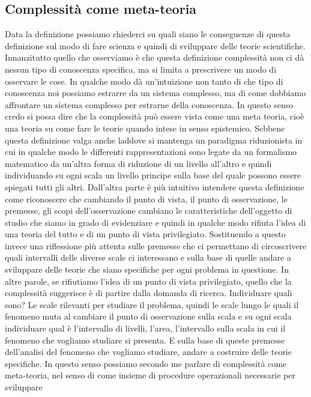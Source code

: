 \documentclass[a4paper, headings=standardclasses]{scrartcl}
\begin{document}
\subsection{Complessità come meta-teoria}
Data la definizione possiamo chiederci su quali siano le conseguenze di questa definizione
sul modo di fare scienza e quindi di sviluppare delle teorie scientifiche.
Innanzitutto quello che osserviamo è che questa definizione complessità non ci dà
nessun tipo di conoscenza specifica, ma si limita a prescrivere un modo di osservare le cose.
In qualche modo dà un'intuizione non tanto di che tipo di conoscenza noi possiamo estrarre
da un sistema complesso, ma di come dobbiamo affrontare un sistema complesso per estrarne
della conoscenza. In questo senso credo si possa dire che la complessità può essere vista
come una meta teoria, cioè una teoria su come fare le teorie quando intese in senso epistemico.
Sebbene questa definizione valga anche laddove si mantenga un paradigma riduzionista in cui
in qualche modo le differenti rappresentazioni sono legate da un formalismo matematico da un'altra
forma di riduzione di un livello all'altro e quindi individuando su ogni scala un livello
principe sulla base del quale possono essere spiegati tutti gli altri. Dall'altra parte è
più intuitivo intendere questa definizione come riconoscere che cambiando il punto di vista,
il punto di osservazione, le premesse, gli scopi dell'osservazione cambiano le caratteristiche
dell'oggetto di studio che siamo in grado di evidenziare e quindi in qualche modo rifiuta
l'idea di una teoria del tutto e di un punto di vista privilegiato. Sostituendo a questo invece
una riflessione più attenta sulle premesse che ci permettano di circoscrivere quali intervalli
delle diverse scale ci interessano e sulla base di quelle andare a sviluppare delle teorie che siano
specifiche per ogni problema in questione. In altre parole, se rifiutiamo l'idea di un
punto di vista privilegiato, quello che la complessità suggerisce è di partire dalla
domanda di ricerca. Individuare quali sono?
Le scale rilevanti per studiare il problema, quindi le scale lungo le quali il fenomeno muta
al cambiare il punto di osservazione sulla scala e su ogni scala individuare qual è l'intervallo
di livelli, l'area, l'intervallo sulla scala in cui il fenomeno che vogliamo studiare si
presenta. E sulla base di queste premesse dell'analisi del fenomeno che vogliamo studiare, andare
a costruire delle teorie specifiche. In questo senso possiamo secondo me parlare di complessità
come meta-teoria, nel senso di come insieme di procedure operazionali necessarie per sviluppare
\end{document}
